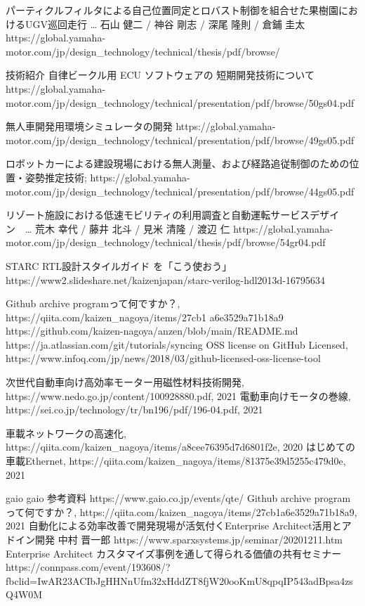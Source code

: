 \documentclass[twocolumn]{article} %
\begin{document}
\begin{thebibliography}{99}
 パーティクルフィルタによる自己位置同定とロバスト制御を組合せた果樹園におけるUGV巡回走行 … 石山 健二 / 神谷 剛志 / 深尾 隆則 / 倉鋪 圭太
https://global.yamaha-motor.com/jp/design\_technology/technical/thesis/pdf/browse/

 技術紹介 自律ビークル用 ECU ソフトウェアの 短期開発技術について
https://global.yamaha-motor.com/jp/design\_technology/technical/presentation/pdf/browse/50gs04.pdf

 無人車開発用環境シミュレータの開発
https://global.yamaha-motor.com/jp/design\_technology/technical/presentation/pdf/browse/49gs05.pdf

ロボットカーによる建設現場における無人測量、および経路追従制御のための位置・姿勢推定技術;
https://global.yamaha-motor.com/jp/design\_technology/technical/presentation/pdf/browse/44gs05.pdf

リゾート施設における低速モビリティの利用調査と自動運転サービスデザイン　… 荒木 幸代 / 藤井 北斗 / 見米 清隆 / 渡辺 仁
https://global.yamaha-motor.com/jp/design\_technology/technical/thesis/pdf/browse/54gr04.pdf

 STARC RTL設計スタイルガイド を「こう使おう」
https://www2.slideshare.net/kaizenjapan/starc-verilog-hdl2013d-16795634

 Github archive programって何ですか？, https://qiita.com/kaizen\_nagoya/items/27cb1 a6e3529a71b18a9
 https://github.com/kaizen-nagoya/anzen/blob/main/README.md
 https://ja.atlassian.com/git/tutorials/syncing
 OSS license on GitHub Licensed, https://www.infoq.com/jp/news/2018/03/github-licensed-oss-license-tool


 次世代自動車向け高効率モーター用磁性材料技術開発, https://www.nedo.go.jp/content/100928880.pdf, 2021
電動車向けモータの巻線, https://sei.co.jp/technology/tr/bn196/pdf/196-04.pdf, 2021

車載ネットワークの高速化, https://qiita.com/kaizen\_nagoya/items/a8cee76395d7d6801f2e, 2020
はじめての車載Ethernet, https://qiita.com/kaizen\_nagoya/items/81375e39d5255c479d0e, 2021

\bibitem{}gaio gaio 参考資料
https://www.gaio.co.jp/events/qte/
 Github archive programって何ですか？, https://qiita.com/kaizen\_nagoya/items/27cb1a6e3529a71b18a9, 2021
自動化による効率改善で開発現場が活気付くEnterprise Architect活用とアドイン開発 中村 晋一郎 
https://www.sparxsystems.jp/seminar/20201211.htm
 Enterprise Architect カスタマイズ事例を通して得られる価値の共有セミナー
https://connpass.com/event/193608/?fbclid=IwAR23ACIbJgHHNnUfm32xHddZT8fjW20ooKmU8qpqIP543adBpsa4zsQ4W0M



\end{thebibliography}
\end{document}
